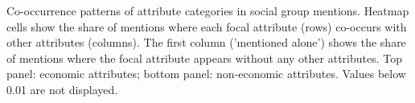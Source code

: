 Co-occurrence patterns of attribute categories in social group mentions. Heatmap cells show the share of mentions where each focal attribute (rows) co-occurs with other attributes (columns). The first column ('mentioned alone') shows the share of mentions where the focal attribute appears without any other attributes. Top panel: economic attributes; bottom panel: non-economic attributes. Values below 0.01 are not displayed.